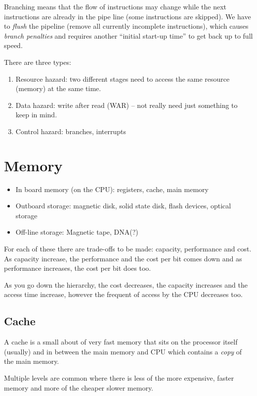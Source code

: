Branching means that the flow of instructions may change while the next instructions are already in the pipe line (some instructions are skipped).
We have to \emph{flush} the pipeline (remove all currently incomplete instructions), which causes \emph{branch penalties} and requires another ``initial start-up time'' to get back up to full speed.

There are three types:
\begin{enumerate}
	\item Resource hazard: two different stages need to access the same resource (memory) at the same time.
	\item Data hazard: write after read (WAR) -- not really need just something to keep in mind.
	\item Control hazard: branches, interrupts
\end{enumerate}
\section{Memory}\label{sec:memory}

\begin{itemize}
	\item In board memory (on the CPU): registers, cache, main memory
	\item Outboard storage: magnetic disk, solid state disk, flash devices, optical storage
	\item Off-line storage: Magnetic tape, DNA(?)
\end{itemize}
%
For each of these there are trade-offs to be made: capacity, performance and cost.
As capacity increase, the performance and the cost per bit comes down and as performance increases, the cost per bit does too.

As you go down the hierarchy, the cost decreases, the capacity increases and the access time increase, however the frequent of access by the CPU decreases too.

\subsection{Cache}\label{sub:cache}

A cache is a small about of very fast memory that sits on the processor itself (usually) and in between the main memory and CPU which contains a \emph{copy} of the main memory.

Multiple levels are common where there is less of the more expensive, faster memory and more of the cheaper slower memory.

